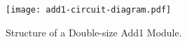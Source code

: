 \documentclass[handout]{mcs}
\begin{document}
\begin{figure}[htbp]
\texttt{[image: add1-circuit-diagram.pdf]}
\caption{Structure of a Double-size Add1 Module.}
\label{fig:add1}
\end{figure}

\end{document}
